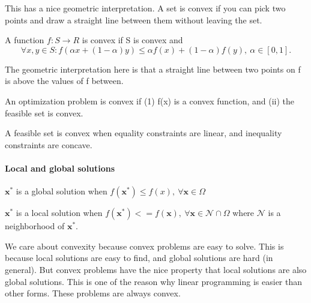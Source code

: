 \documentclass{article}
\begin{document}
This has a nice geometric interpretation. A set is convex if you can pick two points and draw a straight line 
between them without leaving the set.

\medskip

A function $f: S \to R$ is convex if S is convex and 
\[
  \forall x,y\in S : f(\alpha x + (1-\alpha) y) \leq \alpha f(x) + (1-\alpha)f(y) ,\ \alpha\in [ 0,1]
.\] 

The geometric interpretation here is that a straight line between two points on f is above the values of f between.

\medskip

An optimization problem is convex if (1) f(x) is a convex function, and (ii) the feasible set is convex. 

\medskip

A feasible set is convex when equality constraints are linear, and inequality constraints are concave.

\paragraph{Local and global solutions} $\mathbf{x^*}$ is a global solution when $f(\mathbf{x^*}) \leq f(x) ,\ \forall \mathbf{x}\in \Omega$

\medskip

$\mathbf{x^*}$ is a local solution when $f(\mathbf{x^*}) <= f(\mathbf{x}),\  \forall \mathbf{x}\in \mathcal{N} \cap \Omega $ where $\mathcal{N}$ is a neighborhood of $\mathbf{x^*}$.

\medskip

We care about convexity because convex problems are easy to solve. This is because local solutions are easy to find, and global solutions are hard (in general). But convex problems 
have the nice property that local solutions are also global solutions. This is one of the reason why linear programming is easier than other forms. These problems are always convex.
\end{document}
